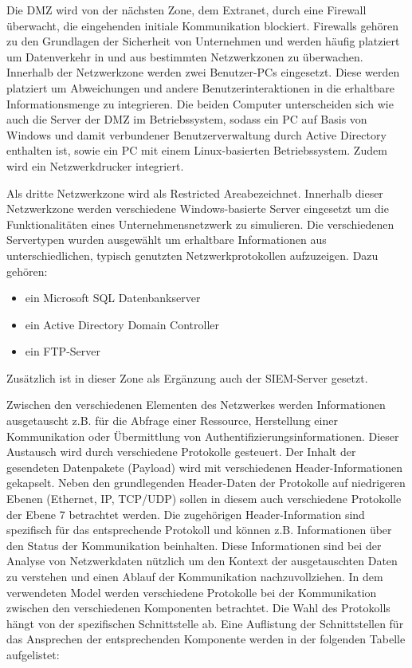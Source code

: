 Die DMZ wird von der nächsten Zone, dem Extranet, durch eine Firewall überwacht, die eingehenden initiale Kommunikation blockiert. Firewalls gehören zu den Grundlagen der Sicherheit von Unternehmen und werden häufig platziert um Datenverkehr in und aus bestimmten Netzwerkzonen zu überwachen. Innerhalb der Netzwerkzone werden zwei Benutzer-PCs eingesetzt. Diese werden platziert um Abweichungen und andere Benutzerinteraktionen in die erhaltbare Informationsmenge zu integrieren. Die beiden Computer unterscheiden sich wie auch die Server der DMZ im Betriebssystem, sodass ein PC auf Basis von Windows und damit verbundener Benutzerverwaltung durch Active Directory enthalten ist, sowie ein PC mit einem Linux-basierten Betriebssystem. Zudem wird ein Netzwerkdrucker integriert.

Als dritte Netzwerkzone wird als \glqq Restricted Area\grqq bezeichnet. Innerhalb dieser Netzwerkzone werden verschiedene Windows-basierte Server eingesetzt um die Funktionalitäten eines Unternehmensnetzwerk zu simulieren. Die verschiedenen Servertypen wurden ausgewählt um erhaltbare Informationen aus unterschiedlichen, typisch genutzten Netzwerkprotokollen aufzuzeigen. Dazu gehören: 
\begin{itemize}
\item ein Microsoft SQL Datenbankserver 
\item ein Active Directory Domain Controller 
\item ein FTP-Server
\end{itemize}

Zusätzlich ist in dieser Zone als Ergänzung auch der SIEM-Server gesetzt.

Zwischen den verschiedenen Elementen des Netzwerkes werden Informationen ausgetauscht z.B. für die Abfrage einer Ressource, Herstellung einer Kommunikation oder Übermittlung von Authentifizierungsinformationen. Dieser Austausch wird durch verschiedene Protokolle gesteuert. Der Inhalt der gesendeten Datenpakete (Payload) wird mit verschiedenen Header-Informationen gekapselt. Neben den grundlegenden Header-Daten der Protokolle auf niedrigeren Ebenen (Ethernet, IP, TCP/UDP) sollen in diesem auch verschiedene Protokolle der Ebene 7 betrachtet werden. Die zugehörigen Header-Information sind spezifisch für das entsprechende Protokoll und können z.B. Informationen über den Status der Kommunikation beinhalten. Diese Informationen sind bei der Analyse von Netzwerkdaten nützlich um den Kontext der ausgetauschten Daten zu verstehen und einen Ablauf der Kommunikation nachzuvollziehen.
In dem verwendeten Model werden verschiedene Protokolle bei der Kommunikation zwischen den verschiedenen Komponenten betrachtet. Die Wahl des Protokolls hängt von der spezifischen Schnittstelle ab. Eine Auflistung der Schnittstellen für das Ansprechen der entsprechenden Komponente werden in der folgenden Tabelle aufgelistet:

